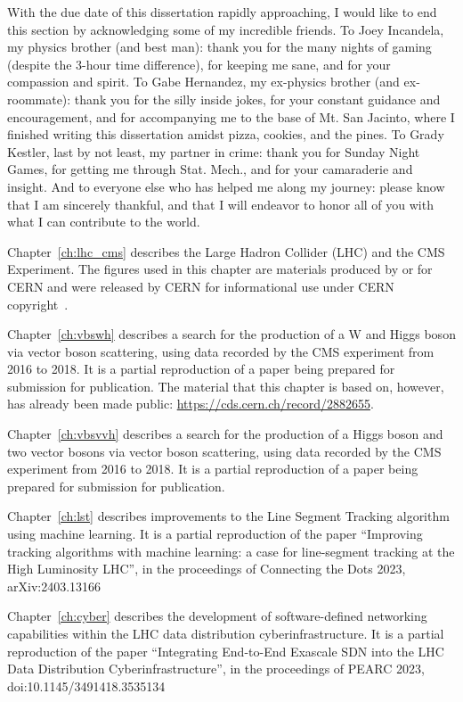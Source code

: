 \begin{acknowledgements}
With the due date of this dissertation rapidly approaching, I would like to end this section by acknowledging some of my incredible friends. 
To Joey Incandela, my physics brother (and best man): thank you for the many nights of gaming (despite the 3-hour time difference), for keeping me sane, and for your compassion and spirit. 
To Gabe Hernandez, my ex-physics brother (and ex-roommate): thank you for the silly inside jokes, for your constant guidance and encouragement, and for accompanying me to the base of Mt. San Jacinto, where I finished writing this dissertation amidst pizza, cookies, and the pines. 
To Grady Kestler, last by not least, my partner in crime: thank you for Sunday Night Games, for getting me through Stat. Mech., and for your camaraderie and insight. 
And to everyone else who has helped me along my journey: please know that I am sincerely thankful, and that I will endeavor to honor all of you with what I can contribute to the world. 

Chapter~\ref{ch:lhc_cms} describes the Large Hadron Collider (LHC) and the CMS Experiment. 
The figures used in this chapter are materials produced by or for CERN and were released by CERN for informational use under CERN copyright~\cite{CERNCopyright}. 

Chapter~\ref{ch:vbswh} describes a search for the production of a W and Higgs boson via vector boson scattering, using data recorded by the CMS experiment from 2016 to 2018. 
It is a partial reproduction of a paper being prepared for submission for publication. 
The material that this chapter is based on, however, has already been made public: \url{https://cds.cern.ch/record/2882655}.

Chapter~\ref{ch:vbsvvh} describes a search for the production of a Higgs boson and two vector bosons via vector boson scattering, using data recorded by the CMS experiment from 2016 to 2018. 
It is a partial reproduction of a paper being prepared for submission for publication. 

Chapter~\ref{ch:lst} describes improvements to the Line Segment Tracking algorithm using machine learning. 
It is a partial reproduction of the paper ``Improving tracking algorithms with machine learning: a case for line-segment tracking at the High Luminosity LHC'', in the proceedings of Connecting the Dots 2023, arXiv:2403.13166

Chapter~\ref{ch:cyber} describes the development of software-defined networking capabilities within the LHC data distribution cyberinfrastructure. 
It is a partial reproduction of the paper ``Integrating End-to-End Exascale SDN into the LHC Data Distribution Cyberinfrastructure'', in the proceedings of PEARC 2023, doi:10.1145/3491418.3535134

\end{acknowledgements}
